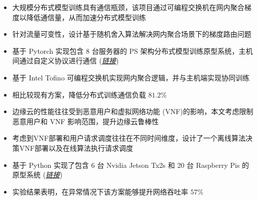 \documentclass{resume}
\begin{document}
\begin{itemize}[parsep=0.5ex]
  \item 大规模分布式模型训练具有通信瓶颈，该项目通过可编程交换机在网内聚合梯度以降低通信量，从而加速分布式模型训练
  \item 针对流量可变性，设计基于随机舍入算法解决网内聚合场景下的梯度路由问题
  \item 基于 Pytorch 实现包含 8 台服务器的 PS 架构分布式模型训练原型系统，主机间通过自定义协议进行通信 (\href{https://github.com/Fangjin98/distributed-training-INA/}{\textit{链接}})
  \item 基于 Intel Tofino 可编程交换机实现网内聚合逻辑，并与主机端实现协同训练
  \item 相比较现有方案，降低分布式训练通信负载 $81.2\%$
\end{itemize}

\begin{itemize}[parsep=0.5ex]
  \item 边缘云的性能往往受到恶意用户和虚拟网络功能 (VNF)的影响，本文考虑限制恶意用户和 VNF 影响范围，提升边缘云鲁棒性
  \item 考虑到VNF部署和用户请求调度往往在不同时间维度，设计了一个离线算法决策VNF部署以及在线算法执行请求调度
  \item 基于 Python 实现了包含 6 台 Nvidia Jetson Tx2s 和 20 台 Raspberry Pis 的原型系统 (\href{https://github.com/Fangjin98/reveal-src}{\textit{链接}})
  \item 实验结果表明，在异常情况下该方案能够提升网络吞吐率 $57\%$
\end{itemize}

\end{document}

